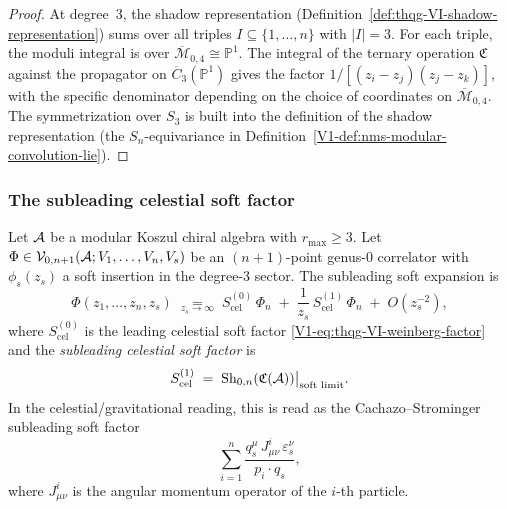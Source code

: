 \begin{proof}
At degree~$3$, the shadow representation
(Definition~\ref{def:thqg-VI-shadow-representation}) sums over
all triples $I \subseteq \{1,\dotsc,n\}$ with $|I| = 3$.
For each triple, the moduli integral is over
$\overline{\mathcal{M}}_{0,4} \cong \mathbb{P}^1$.
The integral of the ternary operation $\mathfrak{C}$ against the
propagator on $\overline{C}_3(\mathbb{P}^1)$ gives the factor
$1/[(z_i - z_j)(z_j - z_k)]$, with the specific denominator
depending on the choice of coordinates on
$\overline{\mathcal{M}}_{0,4}$. The symmetrization over $S_3$
is built into the definition of the shadow representation
(the $S_n$-equivariance in
Definition~\ref{V1-def:nms-modular-convolution-lie}).
\end{proof}

\subsubsection{The subleading celestial soft factor}

\begin{theorem}
Let $\mathcal{A}$ be a modular Koszul chiral algebra with $r_{\max} \geq 3$.
Let $\Phi \in \mathcal{V}_{0,n+1}(\mathcal{A}; V_1, \dotsc, V_n, V_s)$ be an
$(n+1)$-point genus-$0$ correlator with $\phi_s(z_s)$ a soft
insertion in the degree-$3$ sector. The subleading soft expansion is
\begin{equation}%
\Phi(z_1, \dotsc, z_n, z_s)
\;\underset{z_s \to \infty}{=}\;
S^{(0)}_{\mathrm{cel}}\,\Phi_n
\;+\;
\frac{1}{z_s}\,S^{(1)}_{\mathrm{cel}}\,\Phi_n
\;+\; O(z_s^{-2}),
\end{equation}
where $S^{(0)}_{\mathrm{cel}}$ is the leading celestial soft factor
\eqref{V1-eq:thqg-VI-weinberg-factor} and the
\emph{subleading celestial soft factor} is
\begin{equation}%
S^{(1)}_{\mathrm{cel}}
\;=\;
\Sh_{0,n}(\mathfrak{C}(\cA))\bigl|_{\text{soft limit}}.
\end{equation}
In the celestial/gravitational reading, this is read as the
Cachazo--Strominger subleading soft factor
\[
\sum_{i=1}^{n}
\frac{q_s^\mu\,J^i_{\mu\nu}\,\varepsilon_s^\nu}{p_i \cdot q_s},
\]
where $J^i_{\mu\nu}$ is the angular momentum operator of the
$i$-th particle.
\end{theorem}

